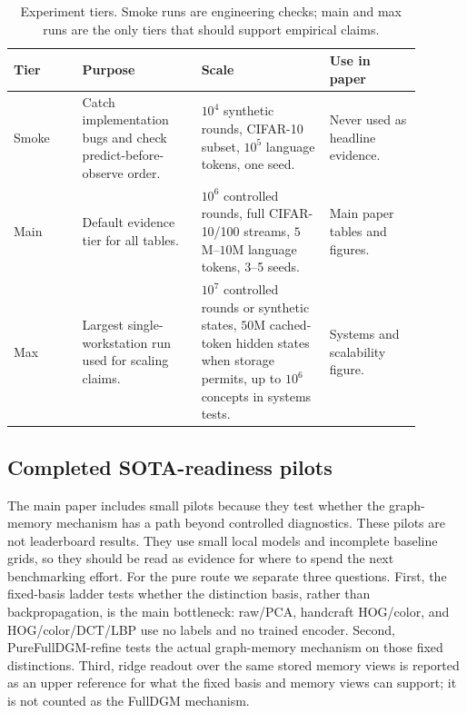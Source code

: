 \begin{table}[h]
\centering
\small
\begin{tabular}{>{\raggedright\arraybackslash}p{0.15\linewidth}
>{\raggedright\arraybackslash}p{0.26\linewidth}
>{\raggedright\arraybackslash}p{0.28\linewidth}
>{\raggedright\arraybackslash}p{0.20\linewidth}}
\toprule
Tier & Purpose & Scale & Use in paper \\
\midrule
Smoke & Catch implementation bugs and check predict-before-observe order. &
$10^4$ synthetic rounds, CIFAR-10 subset, $10^5$ language tokens, one seed. &
Never used as headline evidence. \\
Main & Default evidence tier for all tables. &
$10^6$ controlled rounds, full CIFAR-10/100 streams, $5$M--$10$M language tokens,
3--5 seeds. & Main paper tables and figures. \\
Max & Largest single-workstation run used for scaling claims. &
$10^7$ controlled rounds or synthetic states, $50$M cached-token hidden states
when storage permits, up to $10^6$ concepts in systems tests. &
Systems and scalability figure. \\
\bottomrule
\end{tabular}
\caption{Experiment tiers. Smoke runs are engineering checks; main and max runs
are the only tiers that should support empirical claims.}
\label{tab:single-workstation-run-tiers}
\end{table}

\subsection{Completed SOTA-readiness pilots}
\label{app:sota-readiness-pilots}

The main paper includes small pilots because they test whether the graph-memory
mechanism has a path beyond controlled diagnostics. These pilots are not
leaderboard results. They use small local models and incomplete baseline grids,
so they should be read as evidence for where to spend the next benchmarking
effort.
For the pure route we separate three questions. First, the fixed-basis ladder
tests whether the distinction basis, rather than backpropagation, is the main
bottleneck: raw/PCA, handcraft HOG/color, and HOG/color/DCT/LBP use no labels and
no trained encoder. Second, PureFullDGM-refine tests the actual graph-memory
mechanism on those fixed distinctions. Third, ridge readout over the same stored
memory views is reported as an upper reference for what the fixed basis and
memory views can support; it is not counted as the FullDGM mechanism.

